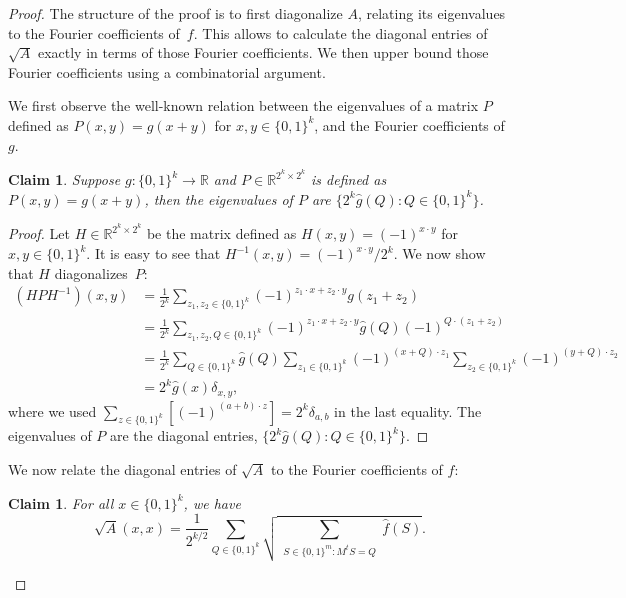 \documentclass[twoside,11pt]{article}
\newcommand{\R}{\ensuremath{\mathbb{R}}}
\newtheorem{claim}[theorem]{Claim}
\def\01{\{0,1\}}
\begin{document}
\begin{proof}
	The structure of the proof is to first diagonalize $A$, relating its eigenvalues to the Fourier coefficients of~$f$. This allows to calculate the diagonal entries of $\sqrt{A}$ exactly in terms of those Fourier coefficients. We then upper bound those Fourier coefficients using a combinatorial argument.
	
	We first observe the well-known relation between the eigenvalues of a matrix $P$ defined as $P(x,y)=g(x+y)$ for $x,y\in \01^k$, and the Fourier coefficients of $g$.
	\begin{claim}
		\label{claim:symmmatrixeigenvaluesfourier}
		Suppose $g:\01^k\rightarrow \R$ and $P\in \R^{2^k\times 2^k}$ is defined as $P(x,y)=g(x+y)$, then the eigenvalues of $P$ are $\{2^k\widehat{g}(Q):Q\in \01^k\}$.
	\end{claim}
	
	\begin{proof}
		Let $H \in \R^{2^k\times 2^k}$ be the matrix defined as $H(x,y)=(-1)^{x\cdot y}$ for $x,y \in \01^k$. It is easy to see that $H^{-1}(x,y)=(-1)^{x\cdot y}/2^k$. We now show that $H$ diagonalizes~$P$:
		\begin{align*}
		(HPH^{-1})(x,y)&=\frac{1}{2^k}\sum_{z_1,z_2 \in \01^{k}}(-1)^{z_1\cdot x+ z_2\cdot y}g(z_1+ z_2) \\
		&=\frac{1}{2^k}\sum_{z_1,z_2,Q \in \01^k}(-1)^{z_1\cdot x+ z_2\cdot y}\widehat{g}(Q) (-1)^{Q\cdot(z_1+ z_2)} \tag{Fourier expansion of $g$}\\
		&= \frac{1}{2^k}\sum_{Q\in\01^k}\widehat{g}(Q)\sum_{z_1\in\01^k}(-1)^{(x+Q)\cdot z_1}\sum_{z_2\in\01^k}(-1)^{(y+Q)\cdot z_2}\\ 
		&= 2^k \widehat{g}(x) \delta_{x,y}, 
		\end{align*}
where we used $\sum_{z\in \01^k} [(-1)^{(a+b)\cdot z}]=2^k\delta_{a,b}$ in the last equality. 	The eigenvalues of $P$ are the diagonal entries, $\{2^k\widehat{g}(Q): Q\in \01^k\}$.
	\end{proof}
	
	We now relate the diagonal entries of $\sqrt{A}$ to the Fourier coefficients of $f$:
	
	\begin{claim}
		\label{claim:sqrtGram}
		For all $x\in \01^k$, we have 
		$$
		\sqrt{A}(x,x)=\frac{1}{2^{k/2}}\sum_{Q\in \01^k} \sqrt{ \sum_{\substack{S\in \01^m:M^t S =Q}} \widehat{f} (S)} 
		.
		$$
	\end{claim}
	

\end{proof}
\end{document}
